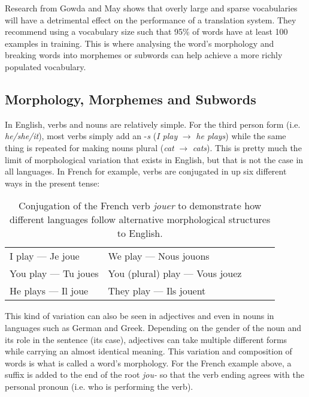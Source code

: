 \documentclass[11pt]{article}
\begin{document}
\bigskip

Research from Gowda and May \citeyearpar{gowda-may-2020-finding} shows that overly large and sparse vocabularies will have a detrimental effect on the performance of a translation system. They recommend using a vocabulary size such that 95\% of words have at least 100 examples in training. This is where analysing the word's morphology and breaking words into morphemes or subwords can help achieve a more richly populated vocabulary.

\subsection{Morphology, Morphemes and Subwords}

In English, verbs and nouns are relatively simple. For the third person form (i.e. \textit{he/she/it}), most verbs simply add an -\textit{s} (\textit{I play} $\to$ \textit{he plays}) while the same thing is repeated for making nouns plural (\textit{cat} $\to$ \textit{cats}). This is pretty much the limit of morphological variation that exists in English, but that is not the case in all languages. In French for example, verbs are conjugated in up six different ways in the present tense:

\begin{table}[h]
\centering
\begin{tabular}{lllll}
I play — Je joue    & We play — Nous jouons           \\
You play — Tu joues & You (plural) play — Vous jouez  \\
He plays — Il joue  & They play — Ils jouent          \\
\end{tabular}
\caption{Conjugation of the French verb \textit{jouer} to demonstrate how different languages follow alternative morphological structures to English.}
\label{table:conjugation}

\end{table}

\bigskip

This kind of variation can also be seen in adjectives and even in nouns in languages such as German and Greek. Depending on the gender of the noun and its role in the sentence (its case), adjectives can take multiple different forms while carrying an almost identical meaning. This variation and composition of words is what is called a word's morphology. For the French example above, a suffix is added to the end of the root \textit{jou-} so that the verb ending agrees with the personal pronoun (i.e. who is performing the verb). 
\end{document}
